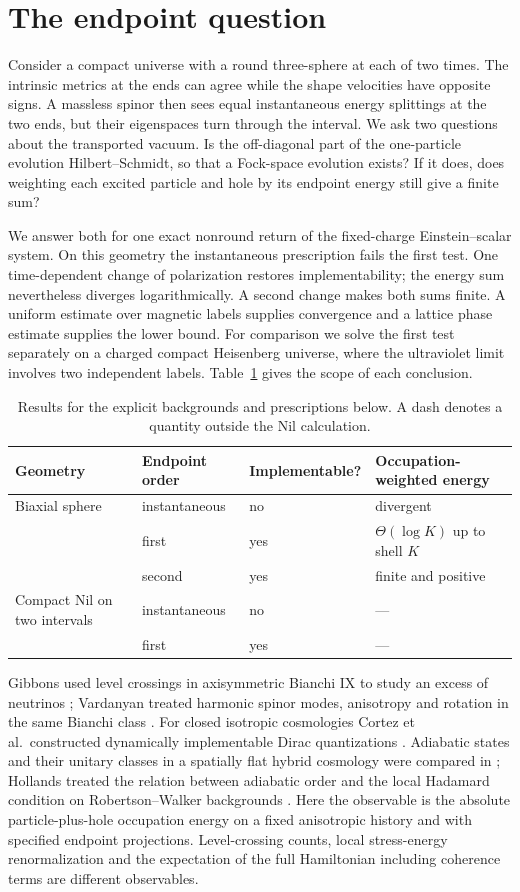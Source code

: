 \section{The endpoint question}\label{sec:01}
Consider a compact universe with a round three-sphere at each of two times. The intrinsic metrics at the ends can agree while the shape velocities have opposite signs. A massless spinor then sees equal instantaneous energy splittings at the two ends, but their eigenspaces turn through the interval. We ask two questions about the transported vacuum. Is the off-diagonal part of the one-particle evolution Hilbert--Schmidt, so that a Fock-space evolution exists? If it does, does weighting each excited particle and hole by its endpoint energy still give a finite sum?

We answer both for one exact nonround return of the fixed-charge Einstein--scalar system. On this geometry the instantaneous prescription fails the first test. One time-dependent change of polarization restores implementability; the energy sum nevertheless diverges logarithmically. A second change makes both sums finite. A uniform estimate over magnetic labels supplies convergence and a lattice phase estimate supplies the lower bound. For comparison we solve the first test separately on a charged compact Heisenberg universe, where the ultraviolet limit involves two independent labels. Table~\ref{tab:main} gives the scope of each conclusion.
\begin{table}[ht]\centering\small
\begin{tabular}{llll}\toprule
Geometry & Endpoint order & Implementable? & Occupation-weighted energy\\\midrule
Biaxial sphere & instantaneous & no & divergent\\
 & first & yes & $\Theta(\log K)$ up to shell $K$\\
 & second & yes & finite and positive\\
Compact Nil on two intervals & instantaneous & no & ---\\
 & first & yes & ---\\\bottomrule
\end{tabular}
\caption{Results for the explicit backgrounds and prescriptions below. A dash denotes a quantity outside the Nil calculation.}\label{tab:main}
\end{table}

Gibbons used level crossings in axisymmetric Bianchi IX to study an excess of neutrinos \cite{gibbons}; Vardanyan treated harmonic spinor modes, anisotropy and rotation in the same Bianchi class \cite{vardanyan}. For closed isotropic cosmologies Cortez et al.\ constructed dynamically implementable Dirac quantizations \cite{cortez}. Adiabatic states and their unitary classes in a spatially flat hybrid cosmology were compared in \cite{navascues}; Hollands treated the relation between adiabatic order and the local Hadamard condition on Robertson--Walker backgrounds \cite{hollands}. Here the observable is the absolute particle-plus-hole occupation energy on a fixed anisotropic history and with specified endpoint projections. Level-crossing counts, local stress-energy renormalization and the expectation of the full Hamiltonian including coherence terms are different observables.
